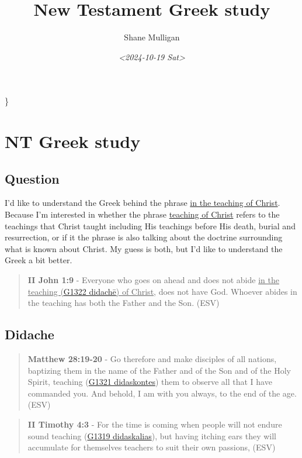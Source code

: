 \documentclass[11pt]{article}
\author{Shane Mulligan}
\date{\textit{<2024-10-19 Sat>}}
\title{New Testament Greek study}
\begin{document}
\maketitle
\makeatletter
\renewcommand\verbatim@font\{\normalfont{}\ttfamily\}
\makeatother

\section{NT Greek study}
\label{sec:orgae9314b}

\subsection{Question}
\label{sec:org61db75b}

I'd like to understand the Greek behind the phrase \uline{in the teaching of Christ}.
Because I'm interested in whether the phrase \uline{teaching of Christ} refers to the teachings that Christ
taught including His teachings before His death, burial and resurrection, or
if it the phrase is also talking about the doctrine surrounding what is known about Christ.
My guess is both, but I'd like to understand the Greek a bit better.

\begin{quote}
\textbf{II John 1:9} - Everyone who goes on ahead and does not abide \uline{in the teaching (\href{https://biblehub.com/greek/1321.htm}{G1322 didachē}) of Christ}, does not have God. Whoever abides in the teaching has both the Father and the Son. (ESV)
\end{quote}

\subsection{Didache}
\label{sec:orgfa16809}
\begin{quote}
\textbf{Matthew 28:19-20} - Go therefore and make disciples of all nations, baptizing them in the name of the Father and of the Son and of the Holy Spirit, teaching (\href{https://biblehub.com/greek/1321.htm}{G1321 didaskontes}) them to observe all that I have commanded you. And behold, I am with you always, to the end of the age. (ESV)
\end{quote}

\begin{quote}
\textbf{II Timothy 4:3} - For the time is coming when people will not endure sound teaching (\href{https://biblehub.com/greek/1319.htm}{G1319 didaskalias}), but having itching ears they will accumulate for themselves teachers to suit their own passions, (ESV)
\end{quote}
\end{document}
